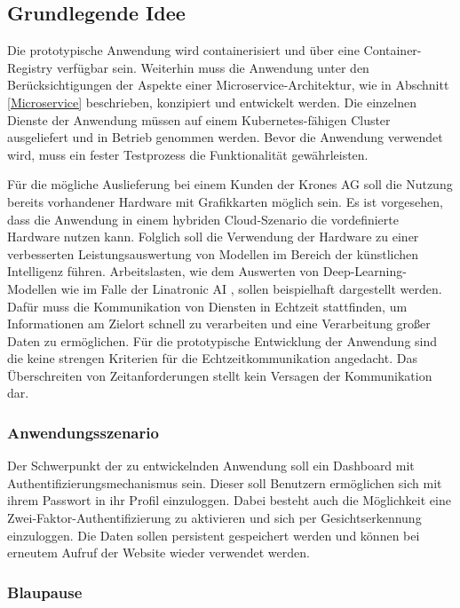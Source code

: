 \subsection{Grundlegende Idee}\label{idee}

Die prototypische Anwendung wird containerisiert und über eine Container-Registry verfügbar sein. 
Weiterhin muss die Anwendung unter den Berücksichtigungen der Aspekte einer Microservice-Architektur, wie in Abschnitt \ref{Microservice} beschrieben, konzipiert und entwickelt werden. 
Die einzelnen Dienste der Anwendung müssen auf einem Kubernetes-fähigen Cluster ausgeliefert und in Betrieb genommen werden.
Bevor die Anwendung verwendet wird, muss ein fester Testprozess die Funktionalität gewährleisten.

Für die mögliche Auslieferung bei einem Kunden der Krones AG soll die Nutzung bereits vorhandener Hardware mit Grafikkarten möglich sein. 
Es ist vorgesehen, dass die Anwendung in einem hybriden Cloud-Szenario die vordefinierte Hardware nutzen kann. 
Folglich soll die Verwendung der Hardware zu einer verbesserten Leistungsauswertung von Modellen im Bereich der künstlichen Intelligenz führen. 
Arbeitslasten, wie dem Auswerten von Deep-Learning-Modellen wie im Falle der Linatronic AI \cite{linatronic}, sollen beispielhaft dargestellt werden. 
Dafür muss die Kommunikation von Diensten in Echtzeit stattfinden, um Informationen am Zielort schnell zu verarbeiten und eine Verarbeitung großer Daten zu ermöglichen.
Für die prototypische Entwicklung der Anwendung sind die keine strengen Kriterien für die Echtzeitkommunikation angedacht.
Das Überschreiten von Zeitanforderungen stellt kein Versagen der Kommunikation dar.


\subsubsection{Anwendungsszenario}\label{Anwendungsszenario}

Der Schwerpunkt der zu entwickelnden Anwendung soll ein Dashboard mit Authentifizierungsmechanismus sein. 
Dieser soll Benutzern ermöglichen sich mit ihrem Passwort in ihr Profil einzuloggen. 
Dabei besteht auch die Möglichkeit eine Zwei-Faktor-Authentifizierung zu aktivieren und sich per Gesichtserkennung einzuloggen.
Die Daten sollen persistent gespeichert werden und können bei erneutem Aufruf der Website wieder verwendet werden. 

\subsubsection{Blaupause}

